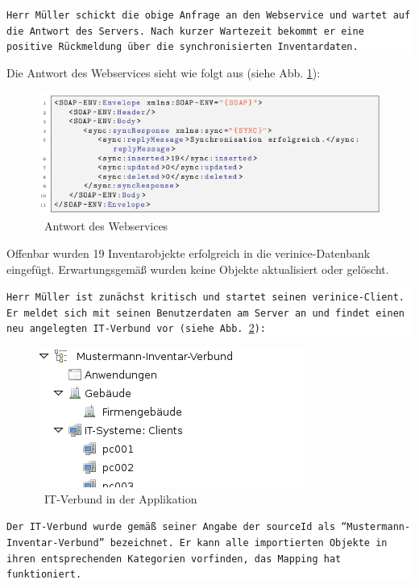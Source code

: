 \documentclass[a4paper,10pt]{book}
\begin{document}
\newline\newline
\colorbox{white}{\parbox{\textwidth}{
{\tt Herr Müller schickt die obige Anfrage an den Webservice und wartet auf die Antwort des Servers. Nach kurzer Wartezeit
bekommt er eine positive Rückmeldung über die synchronisierten Inventardaten.}
}}
\newline\newline
Die Antwort des Webservices sieht wie folgt aus (siehe Abb. \ref{Antwort des Webservices}):
\newline
\begin{figure}[htb!]
  \centering
  \includegraphics[scale=.7]{Screenshot/SyncAPI_Fallstudie_08.png}
  \caption{\label{Antwort des Webservices} \ Antwort des Webservices}
\end{figure}
\newline
Offenbar wurden 19 Inventarobjekte erfolgreich in die verinice-Datenbank eingefügt. Erwartungsgemäß wurden keine Objekte aktualisiert oder gelöscht.
\newline\newline
\colorbox{white}{\parbox{\textwidth}{
{\tt Herr Müller ist zunächst kritisch und startet seinen verinice-Client. Er meldet sich mit seinen Benutzerdaten am Server an und findet einen neu
angelegten IT-Verbund vor (siehe Abb. \ref{IT-Verbund in der Applikation}):}
}}\newline\newline
\begin{figure}[htb!]
  \centering
  \includegraphics[scale=.7]{Screenshot/Verinice_client_screenshot.png}
  \caption{\label{IT-Verbund in der Applikation} \ IT-Verbund in der Applikation}
\end{figure}
\newline
\newline
\colorbox{white}{\parbox{\textwidth}{
{\tt Der IT-Verbund wurde gemäß seiner Angabe der sourceId als ``Mustermann-Inventar-Verbund'' bezeichnet. Er kann alle importierten Objekte in
ihren entsprechenden Kategorien vorfinden, das Mapping hat funktioniert.}
}}\newline\newline
\end{document}
